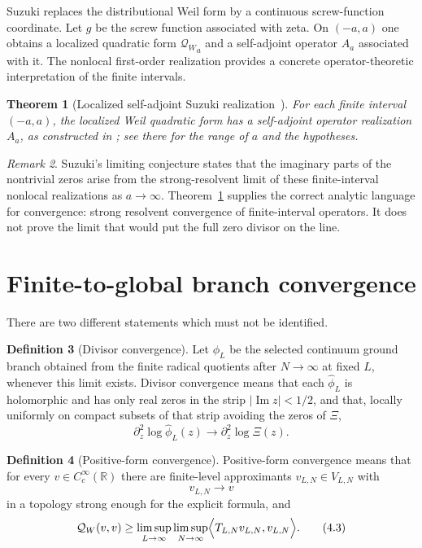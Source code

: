 \documentclass[11pt]{amsart}
\newtheorem{theorem}{Theorem}[section]
\theoremstyle{definition}
\newtheorem{definition}[theorem]{Definition}
\theoremstyle{remark}
\newtheorem{remark}[theorem]{Remark}
\newcommand{\R}{\mathbb R}
\newcommand{\QW}{\mathcal Q_W}
\newcommand{\XiR}{\Xi}
\begin{document}
Suzuki replaces the distributional Weil form by a continuous screw-function
coordinate.  Let \(g\) be the screw function associated with zeta.  On
\((-a,a)\) one obtains a localized quadratic form \({\QW}_a\) and a
self-adjoint operator \(A_a\) associated with it.  The nonlocal
first-order realization provides a concrete operator-theoretic
interpretation of the finite intervals.

\begin{theorem}[Localized self-adjoint Suzuki realization~\cite{Suzuki2025,SuzukiScrew}]
\label{thm:suzuki-input}
For each finite interval \((-a,a)\), the localized Weil quadratic form has
a self-adjoint operator realization \(A_a\), as constructed in
\cite{Suzuki2025,SuzukiScrew}; see there for the range of \(a\) and the
hypotheses.
\end{theorem}

\begin{remark}
Suzuki's limiting conjecture states that the imaginary parts of the
nontrivial zeros arise from the strong-resolvent limit of these
finite-interval nonlocal realizations as \(a\to\infty\).
Theorem~\ref{thm:suzuki-input} supplies the correct analytic language for convergence: strong
resolvent convergence of finite-interval operators.  It does not prove the
limit that would put the full zero divisor on the line.
\end{remark}

\section{Finite-to-global branch convergence}

There are two different statements which must not be identified.

\begin{definition}[Divisor convergence]
Let \(\phi_L\) be the selected continuum ground branch obtained from
the finite radical quotients after \(N\to\infty\) at fixed \(L\),
whenever this limit exists.  Divisor convergence means that each
\(\widehat\phi_L\) is holomorphic and has only real zeros in the strip
\(|\operatorname{Im}z|<1/2\), and that, locally uniformly on compact
subsets of that strip avoiding the zeros of \(\XiR\),
\[
 \partial_z^2\log \widehat\phi_L(z)
 \longrightarrow
 \partial_z^2\log \XiR(z).
\tag{4.1}
\]
\end{definition}

\begin{definition}[Positive-form convergence]
Positive-form convergence means that for every \(v\in C_c^\infty(\R)\)
there are finite-level approximants \(v_{L,N}\in V_{L,N}\) with
\[
 v_{L,N}\to v
\tag{4.2}
\]
in a topology strong enough for the explicit formula, and
\[
 \QW(v,v)
 \ge
 \limsup_{L\to\infty}\limsup_{N\to\infty}
 \Bigl\langle T_{L,N}v_{L,N},v_{L,N}\Bigr\rangle .
\tag{4.3}
\]
\end{definition}
\end{document}
